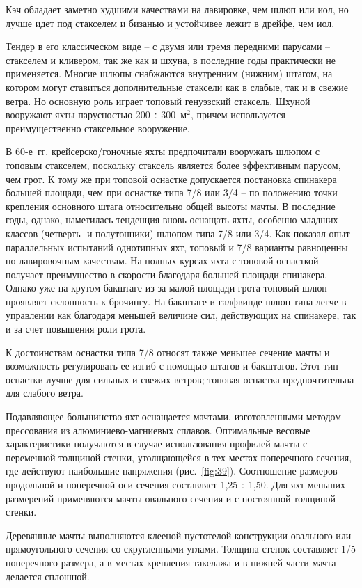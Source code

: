 \documentclass[a4paper, 12pt, twoside, final, book, russian, fittopage, cyremdash]{ncc}
\newcommand{\otdo}{\,\ensuremath{\div}\,}
\newcommand{\ris}[1]{\ref{fig:#1}}
\newcommand{\msq}{~м\ensuremath{^2}\xspace}
\begin{document}
Кэч обладает заметно худшими качествами на лавировке, чем шлюп или иол, но лучше идет под стакселем и бизанью и устойчивее лежит в дрейфе, чем иол. 

Тендер в его классическом виде \--- с двумя или тремя передними парусами \--- стакселем и кливером, так же как и шхуна, в последние годы практически не применяется. Многие шлюпы снабжаются внутренним (нижним) штагом, на котором могут ставиться дополнительные стаксели как в слабые, так и в свежие ветра. Но основную роль играет топовый генуэзский стаксель. Шхуной вооружают яхты парусностью 200\otdo 300\msq, причем используется преимущественно стаксельное вооружение. 

В 60-е~гг. крейсерско\-/гоночные яхты предпочитали вооружать шлюпом с топовым стакселем, поскольку стаксель является более эффективным парусом, чем грот. К тому же при топовой оснастке допускается постановка спинакера большей площади, чем при оснастке типа 7/8 или 3/4 \--- по положению точки крепления основного штага относительно общей высоты мачты. В последние годы, однако, наметилась тенденция вновь оснащать яхты, особенно младших классов (четверть- и полутонники) шлюпом типа 7/8 или 3/4. Как показал опыт параллельных испытаний однотипных яхт, топовый и 7/8 варианты равноценны по лавировочным качествам. На полных курсах яхта с топовой оснасткой получает преимущество в скорости благодаря большей площади спинакера. Однако уже на крутом бакштаге из-за малой площади грота топовый шлюп проявляет склонность к брочингу. На бакштаге и галфвинде шлюп типа легче в управлении как благодаря меньшей величине сил, действующих на спинакере, так и за счет повышения роли грота.

К достоинствам оснастки типа 7/8 относят также меньшее сечение мачты и возможность регулировать ее изгиб с помощью штагов и бакштагов. Этот тип оснастки лучше для сильных и свежих ветров; топовая оснастка предпочтительна для слабого ветра.

Подавляющее большинство яхт оснащается мачтами, изготовленными методом прессования из алюминиево-магниевых сплавов. Оптимальные весовые характеристики получаются в случае использования профилей мачты с переменной толщиной стенки, утолщающейся в тех местах поперечного сечения, где действуют наибольшие напряжения (рис.~\ris{39}). Соотношение размеров продольной и поперечной оси сечения составляет 1,25\otdo 1,50. Для яхт меньших размерений применяются мачты овального сечения и с постоянной толщиной стенки. 

Деревянные мачты выполняются клееной пустотелой конструкции овального или прямоугольного сечения со скругленными углами. Толщина стенок составляет 1/5 поперечного размера, а в местах крепления такелажа и в нижней части мачта делается сплошной.
\end{document}
